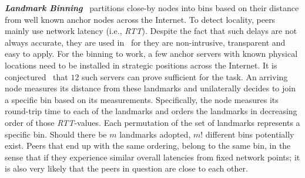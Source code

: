 
\textbf{\emph{Landmark Binning}}~\cite{RHKS2002} partitions close-by nodes
into bins based on their distance from well known anchor nodes across the
Internet.%
To detect locality, peers mainly use network latency (i.e., \emph{RTT}).
Despite the fact that such delays are not always accurate,
they are used in~\cite{RHKS2002} for they are
non-intrusive, transparent and easy to apply.
For the binning to work, a few anchor servers with known
physical locations need to be installed in strategic positions 
across the Internet. 
It is conjectured~\cite{RHKS2002} that $12$ such servers can prove
sufficient for the task.
An arriving node measures its distance from these landmarks
and unilaterally decides to join a specific bin based on its measurements.
%
Specifically, the node measures its round-trip time to each of the landmarks and
orders the landmarks in decreasing order of those \emph{RTT}-values.
Each permutation of the set of landmarks represents a specific bin. 
Should there be $m$ landmarks adopted, $m!$  different bins potentially exist. 
Peers that end up with the same ordering, belong to the same bin, in the sense that
if they experience similar overall latencies from fixed network points; it
is also  very likely that the peers in question are close to each other.

